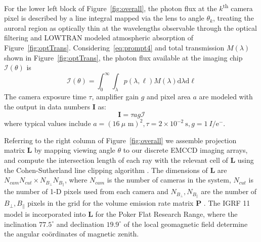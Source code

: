 For the lower left block of Figure~\ref{fig:overall}, the photon flux at the $k$\textsuperscript{th} camera pixel is described by a line integral mapped via the lens to angle $\theta_k$, treating the auroral region as optically thin at the wavelengths observable through the optical filtering and LOWTRAN \citep{lowtran7} modeled atmospheric absorption of Figure~\ref{fig:optTrans}.
Considering~\eqref{eq:prompt4} and total transmission $M(\lambda)$ shown in Figure~\ref{fig:optTrans}, the photon flux available at the imaging chip $\mathscr{I}(\theta)$ is
\begin{equation}\label{eq:grayb}
\mathscr{I}(\theta) =  \int_0^\infty \int_\lambda p(\lambda,\mathbf{\ell}) M(\lambda) \textrm{d} \lambda \textrm{d}\ell
\end{equation}
The camera exposure time $\tau$, amplifier gain $g$ and pixel area $a$ are modeled with the output in data numbers $\mathbf{I}$ as:
\begin{equation}\label{eq:dn}
\mathbf{I} = \tau a g \mathscr{I}
\end{equation}
where typical values include $a=(16~\mu\textrm{ m})^2, \tau = 2\times10^{-2}~\textrm{s}, g=1~I / \textrm{e}^- $.

Referring to the right column of Figure~\ref{fig:overall} we assemble projection matrix $\mathbf{L}$ by mapping viewing angle $\theta$ to our discrete EMCCD imaging arrays, and compute the intersection length of each ray \citep{semdis} with the relevant cell of $\mathbf{L}$ using the Cohen-Sutherland line clipping algorithm \citep{cohensutherland,cvutils}.
The dimensions of $\mathbf{L}$ are $N_{cam} N_{cut} \times N_{B_\perp} N_{B_\parallel}$,  where $N_{cam}$ is the number of cameras in the system, $N_{cut}$ is the number of 1-D pixels used from each camera and $N_{B_\perp},N_{B_\parallel}$ are the number of $B_\perp, B_\parallel$ pixels in the grid for the volume emission rate matrix $\mathbf{P}$ .
The IGRF 11 model is incorporated into $\mathbf{L}$ for the Poker Flat Research Range, where the inclination $77.5^\circ$ and declination $19.9^\circ$ of the local geomagnetic field determine the angular coördinates of magnetic zenith. 

